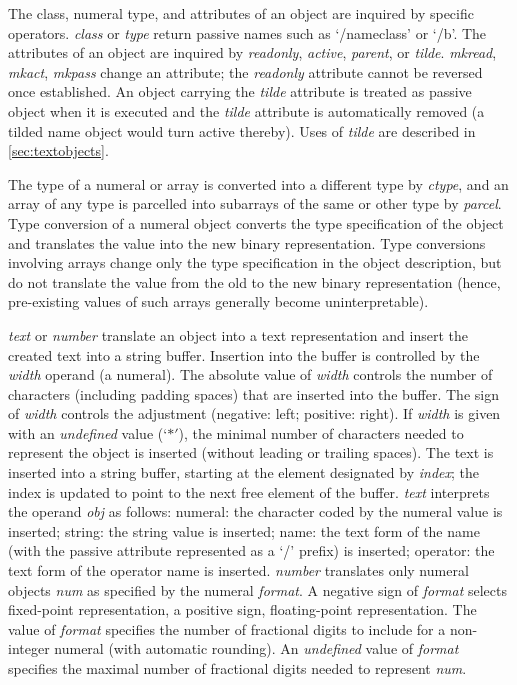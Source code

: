 The  class,  numeral type,  and attributes of an object are  inquired by specific operators. \emph{class} or  \emph{type} return passive names such as  `/nameclass'  or  `/b'. The attributes of an object are inquired by \emph{readonly}, \emph{active}, \emph{parent}, or \emph{tilde}.  \emph{mkread}, \emph{mkact}, \emph{mkpass} change an attribute; the \emph{readonly} attribute cannot be reversed once established. An object carrying the \emph{tilde} attribute is treated as passive object when it is executed and the \emph{tilde} attribute is automatically removed (a tilded name object would turn active thereby). Uses of \emph{tilde} are described in \ref{sec:textobjects}.

The  type  of  a  numeral or array is converted  into  a  different  type by \emph{ctype},  and an array of any type is parcelled into subarrays of the same or other type by \emph{parcel}.  Type conversion of a numeral object converts  the type  specification  of the object and translates the value into  the  new binary representation.  Type conversions involving arrays change only  the type  specification in the object description,  but do not  translate  the value from the old to the new binary representation  (hence,  pre-existing values of such arrays generally become uninterpretable).

\emph{text} or \emph{number} translate an object into a text representation and insert the created text into a string buffer. Insertion into the buffer is controlled by the \emph{width} operand (a numeral). The absolute value of \emph{width} controls the number of characters (including padding spaces) that are inserted into the buffer. The sign of \emph{width} controls the adjustment (negative: left; positive: right). If \emph{width} is given with an \emph{undefined} value (`$\ast'$), the minimal number of characters needed to represent the object is inserted (without leading or trailing spaces). The text is inserted into a string buffer, starting at the element designated by \emph{index}; the index is updated to point to the next free element of the buffer. \emph{text} interprets the operand \emph{obj} as follows: numeral: the character coded by the numeral value is inserted; string: the string value is inserted; name: the text form of the name (with the passive attribute represented as a `/' prefix) is inserted; operator: the text form of the operator name is inserted. \emph{number} translates only numeral objects \emph{num} as specified by the numeral \emph{format}. A negative sign of \emph{format} selects fixed-point representation, a positive sign, floating-point representation. The value of \emph{format} specifies the number of fractional digits to include for a non-integer numeral (with automatic rounding). An \emph{undefined} value of \emph{format} specifies the maximal number of fractional digits needed to represent \emph{num}. 

